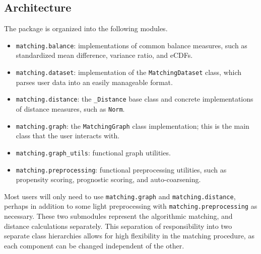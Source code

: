 \documentclass[11pt]{extarticle}
\begin{document}
\subsection{Architecture}

The package is organized into the following modules.
\begin{itemize}
  \item \texttt{matching.balance}: implementations of common balance measures, such as standardized mean difference, variance ratio, and eCDFs.
  \item \texttt{matching.dataset}: implementation of the \texttt{MatchingDataset} class, which parses user data into an easily manageable format.
  \item \texttt{matching.distance}: the \texttt{\_Distance} base class and concrete implementations of distance measures, such as \texttt{Norm}.
  \item \texttt{matching.graph}: the \texttt{MatchingGraph} class implementation; this is the main class that the user interacts with.
  \item \texttt{matching.graph\_utils}: functional graph utilities.
  \item \texttt{matching.preprocessing}: functional preprocessing utilities, such as propensity scoring, prognostic scoring, and auto-coarsening.
\end{itemize}

Most users will only need to use \texttt{matching.graph} and \texttt{matching.distance}, perhaps in addition to some light preprocessing with \texttt{matching.preprocessing} as necessary.
These two submodules represent the algorithmic matching, and distance calculations separately.
This separation of responsibility into two separate class hierarchies allows for high flexibility in the matching procedure, as each component can be changed independent of the other.
\end{document}
